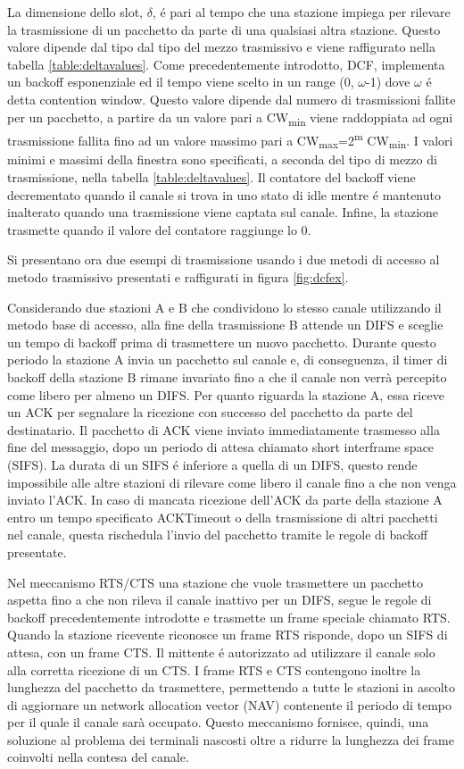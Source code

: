La dimensione dello slot, $\delta$,  \'e pari al tempo che una stazione impiega per rilevare la trasmissione di un pacchetto da parte di una qualsiasi altra stazione.
Questo valore dipende dal tipo dal tipo del mezzo trasmissivo e viene raffigurato nella tabella \ref{table:deltavalues}.
Come precedentemente introdotto, DCF, implementa un backoff esponenziale ed il tempo viene scelto in un range (0, $\omega$-1) dove $\omega$ \'e detta contention window.
Questo valore dipende dal numero di trasmissioni fallite per un pacchetto, a partire da un valore pari a CW\textsubscript{min}  viene raddoppiata ad ogni trasmissione fallita fino ad un valore massimo pari a CW\textsubscript{max}=2\textsuperscript{m} CW\textsubscript{min}.
I valori minimi e massimi della finestra sono specificati, a seconda del tipo di mezzo di trasmissione, nella tabella \ref{table:deltavalues}.
Il contatore del backoff viene decrementato quando il canale si trova in uno stato di idle mentre \'e mantenuto inalterato quando una trasmissione viene captata sul canale.
Infine, la stazione trasmette quando il valore del contatore raggiunge lo 0.

Si presentano ora due esempi di trasmissione usando i due metodi di accesso al metodo trasmissivo presentati e raffigurati in figura \ref{fig:dcfex}.

Considerando due stazioni A e B che condividono lo stesso canale utilizzando il metodo base di accesso, alla fine della trasmissione B attende un DIFS e sceglie un tempo di backoff prima di trasmettere un nuovo pacchetto.
Durante questo periodo la stazione A invia un pacchetto sul canale e, di conseguenza, il timer di backoff della stazione B rimane invariato fino a che il canale non verr\`a percepito come libero per almeno un DIFS.
Per quanto riguarda la stazione A, essa riceve un ACK per segnalare la ricezione con successo del pacchetto da parte del destinatario.
Il pacchetto di ACK viene inviato immediatamente trasmesso alla fine del messaggio, dopo un periodo di attesa chiamato short interframe space (SIFS).
La durata di un SIFS \'e inferiore a quella di un DIFS, questo rende impossibile alle altre stazioni di rilevare come libero il canale fino a che non venga inviato l'ACK.
In caso di mancata ricezione dell'ACK da parte della stazione A entro un tempo specificato ACKTimeout o della trasmissione di altri pacchetti nel canale, questa rischedula l'invio del pacchetto tramite le regole di backoff presentate.

Nel meccanismo RTS/CTS una stazione che vuole trasmettere un pacchetto aspetta fino a che non rileva il canale inattivo per un DIFS, segue le regole di backoff precedentemente introdotte e trasmette un frame speciale chiamato RTS.
Quando la stazione ricevente riconosce un frame RTS risponde, dopo un SIFS di attesa, con un frame CTS.
Il mittente \'e autorizzato ad utilizzare il canale solo alla corretta ricezione di un CTS.
I frame RTS e CTS contengono inoltre la lunghezza del pacchetto da trasmettere, permettendo a tutte le stazioni in ascolto di aggiornare un network allocation vector (NAV) contenente il periodo di tempo per il quale il canale sar\`a occupato.
Questo meccanismo fornisce, quindi, una soluzione al problema dei terminali nascosti oltre a ridurre la lunghezza dei frame coinvolti nella contesa del canale.

